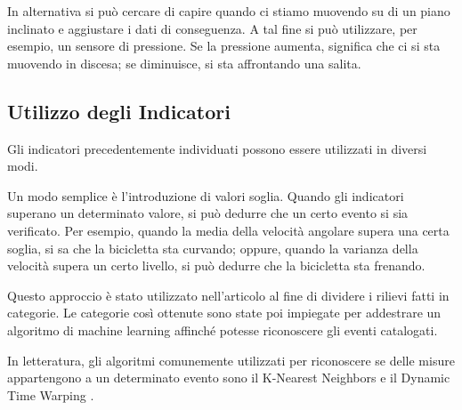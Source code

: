 \documentclass[class=article]{standalone}
\begin{document}
	In alternativa si può cercare di capire quando ci stiamo muovendo su di un piano inclinato e aggiustare i dati di conseguenza. A tal fine si può utilizzare, per esempio, un sensore di pressione. Se la pressione aumenta, significa che ci si sta muovendo in discesa; se diminuisce, si sta affrontando una salita.
	
	
	\subsection{Utilizzo degli Indicatori}
	Gli indicatori precedentemente individuati possono essere utilizzati in diversi modi.
	
	Un modo semplice è l'introduzione di valori soglia. Quando gli indicatori superano un determinato valore, si può dedurre che un certo evento si sia verificato. Per esempio, quando la media della velocità angolare supera una certa soglia, si sa che la bicicletta sta curvando; oppure, quando la varianza della velocità supera un certo livello, si può dedurre che la bicicletta sta frenando.
	
	Questo approccio è stato utilizzato nell'articolo \cite{MA2021106096} al fine di dividere i rilievi fatti in categorie. Le categorie così ottenute sono state poi impiegate per addestrare un algoritmo di machine learning affinché potesse riconoscere gli eventi catalogati.
	
	In letteratura, gli algoritmi comunemente utilizzati per riconoscere se delle misure appartengono a un determinato evento sono il K-Nearest Neighbors \cite{transfun} e il Dynamic Time Warping \cite{dtw,dtwAndCo}.
	
\end{document}
